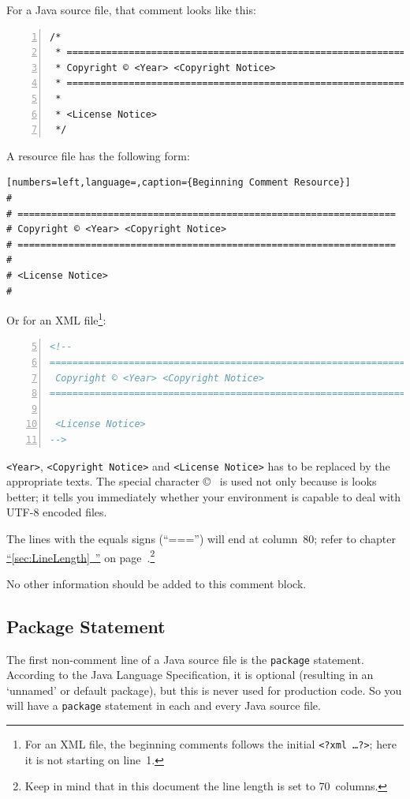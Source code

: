 \documentclass[11pt,a4paper, titlepage, parskip=half, headsepline, footsepline, cleardoublepage=current, headheight=1cm]{scrbook}
\newcommand*{\tqfullvref}[1]{\hyperref[{#1}]{“\ref*{#1}~\nameref*{#1}”} on page~\pageref{#1}}
\begin{document}
For a Java source file, that comment looks like this:
\begin{lstlisting}[numbers=left,caption={Beginning Comment Java}]
/*
 * ==================================================================
 * Copyright © <Year> <Copyright Notice>
 * ==================================================================
 *
 * <License Notice>
 */
\end{lstlisting}

A resource file has the following form: 
\begin{lstlisting}[numbers=left,language=,caption={Beginning Comment Resource}]
#
# ===================================================================
# Copyright © <Year> <Copyright Notice>
# ===================================================================
#
# <License Notice>
#
\end{lstlisting}

Or for an XML file\footnote{For an XML file, the beginning comments follows the initial \lstinline|<?xml …?>|; here it is not starting on line~1.}:
\begin{lstlisting}[numbers=left,firstnumber=5,language=XML,caption={Beginning Comment XML}]
<!--
=====================================================================
 Copyright © <Year> <Copyright Notice>
=====================================================================

 <License Notice>
-->
\end{lstlisting}

\verb#<Year>#, \verb#<Copyright Notice># and \verb#<License Notice># has to be replaced by the appropriate texts. The special character \copyright~ is used not only because is looks better; it tells you immediately whether your environment is capable to deal with UTF-8 encoded files.

The lines with the equals signs (“===”) will end at column~80; refer to chapter \tqfullvref{sec:LineLength}.\footnote{Keep in mind that in this document the line length is set to 70~columns.}

No other information should be added to this comment block.

\subsection{Package Statement}\label{sec:PackageStatement}
The first non-comment line of a Java source file is the \lstinline|package| statement. According to the Java Language Specification\autocite{ORACLE_DOC_LANGUAGE_SPECIFICATION:UnnamedPackages}, it is optional (resulting in an ‘unnamed’ or default package), but this is never used for production code. So you will have a \lstinline|package| statement in each and every Java source file.
\end{document}
